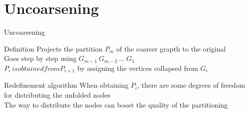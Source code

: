 \documentclass{beamer}
\begin{document}
\section{Uncoarsening}
\begin{frame}{Uncoarsening}
	\begin{block}{Definition}
		Projects the partition \(P_{m}\) of the coarser grapth to the original \\
		Goes step by step using \(G_{m-1}~G_{m-2}~...~G_1\) \\
		\(P_i~is obtained from P_{i+1}\) by assigning the vertices collapsed from \(G_i\)\\
	\end{block}
	\begin{block}{Redefinement algorithm}
		When obtaining \(P_i\), there are some degrees of freedom for distributing the unfolded nodes\\
		The way to distribute the nodes can boost the quality of the partitioning
	\end{block}
\end{frame}
\end{document}
